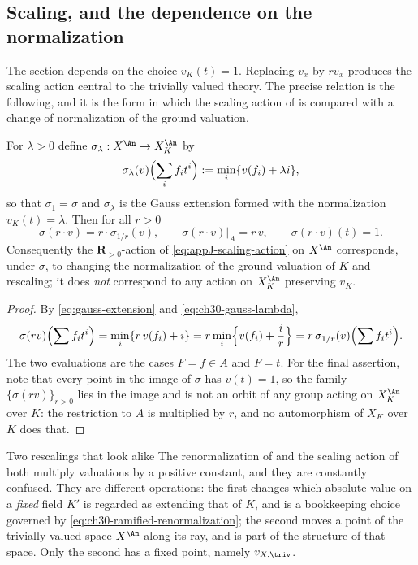 \subsection{Scaling, and the dependence on the normalization}
\label{sec:ch30-gauss-scaling}

The section depends on the choice \(v_K(t)=1\).  Replacing \(v_x\) by
\(rv_x\) produces the scaling action central to the trivially valued theory.
The precise relation is the following, and it is the form in which the
scaling action of  is compared with a
change of normalization of the ground valuation.

\begin{proposition}
\label{prop:ch30-gauss-scaling}
For \(\lambda>0\) define \(\sigma_\lambda:X^{\An}\to X_K^{\An}\) by
\begin{equation}
\label{eq:ch30-gauss-lambda}
 \sigma_\lambda(v)\Bigl(\sum_if_it^i\Bigr):=\min_i\{v(f_i)+\lambda i\},
\end{equation}
so that \(\sigma_1=\sigma\) and \(\sigma_\lambda\) is the Gauss extension
formed with the normalization \(v_K(t)=\lambda\).  Then for all \(r>0\)
\begin{equation}
\label{eq:ch30-gauss-scaling}
 \sigma(r\cdot v)=r\cdot\sigma_{1/r}(v),
 \qquad
 \sigma(r\cdot v)|_A=r\,v,
 \qquad
 \sigma(r\cdot v)(t)=1 .
\end{equation}
Consequently the \(\mathbf R_{>0}\)-action of
\eqref{eq:appJ-scaling-action} on \(X^{\An}\) corresponds, under
\(\sigma\), to changing the normalization of the ground valuation of \(K\)
and rescaling; it does \emph{not} correspond to any action on
\(X_K^{\An}\) preserving \(v_K\).
\end{proposition}

\begin{proof}
By \eqref{eq:gauss-extension} and \eqref{eq:ch30-gauss-lambda},
\[
 \sigma(rv)\Bigl(\sum f_it^i\Bigr)=\min_i\{r\,v(f_i)+i\}
 =r\min_i\Bigl\{v(f_i)+\frac ir\Bigr\}
 =r\,\sigma_{1/r}(v)\Bigl(\sum f_it^i\Bigr).
\]
The two evaluations are the cases \(F=f\in A\) and \(F=t\).  For the final
assertion, note that every point in the image of \(\sigma\) has
\(v(t)=1\), so the family \(\{\sigma(rv)\}_{r>0}\) lies in the image and is
not an orbit of any group acting on \(X_K^{\An}\) over \(K\): the
restriction to \(A\) is multiplied by \(r\), and no automorphism of
\(X_K\) over \(K\) does that.
\end{proof}

\begin{warning}{Two rescalings that look alike}
The renormalization of  and the scaling
action of  both multiply valuations by a
positive constant, and they are constantly confused.  They are different
operations: the first changes which absolute value on a \emph{fixed} field
\(K'\) is regarded as extending that of \(K\), and is a bookkeeping choice
governed by \eqref{eq:ch30-ramified-renormalization}; the second moves a
point of the trivially valued space \(X^{\An}\) along its ray, and is part
of the structure of that space.  Only the second has a fixed point, namely
\(v_{X,\triv}\).
\end{warning}

